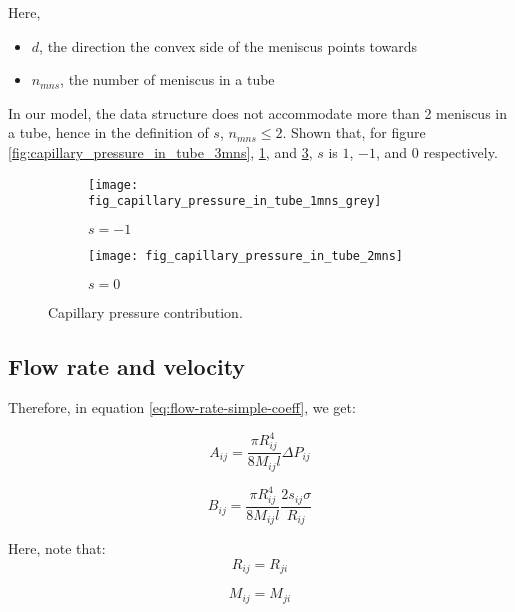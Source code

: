 	Here,
	\begin{itemize}
		\item $d$, the direction the convex side of the meniscus points towards
		\item $n_{mns}$, the number of meniscus in a tube
	\end{itemize}
	
	In our model, the data structure does not accommodate more than 2 meniscus in a tube, hence in the definition of $s$, $n_{mns} \le 2$. Shown that, for figure \ref{fig:capillary_pressure_in_tube_3mns}, \ref{fig:capillary_pressure_in_tube_1mns_grey}, and \ref{fig:capillary_pressure_in_tube_2mns}, $s$ is $1$, $-1$, and $0$ respectively.
	
	\begin{figure}[H]
		\centering
		\begin{subfigure}{0.45\textwidth}
			\centering
			\texttt{[image: fig\_capillary\_pressure\_in\_tube\_1mns\_grey]}
			\caption{$s = -1$}
			\label{fig:capillary_pressure_in_tube_1mns_grey}
		\end{subfigure}
		\hfill
		\begin{subfigure}{0.48\textwidth}
			\centering
			\texttt{[image: fig\_capillary\_pressure\_in\_tube\_2mns]}
			\caption{$s = 0$}
			\label{fig:capillary_pressure_in_tube_2mns}
		\end{subfigure}
		\caption{Capillary pressure contribution.}
	\end{figure}
		
	
\subsection{Flow rate and velocity} \label{sec:flow-rate-vel}
	Therefore, in equation \ref{eq:flow-rate-simple-coeff}, we get:
	
	\begin{equation} \label{eq:flow-rate-aij}
		A_{ij} = \frac{\pi R_{ij}^4}{8M_{ij}l} \Delta P_{ij}
	\end{equation}
	
	\begin{equation} \label{eq:flow-rate-bij}
		B_{ij} = \frac{\pi R_{ij}^4}{8M_{ij}l} \frac{2 s_{ij} \sigma}{R_{ij}}
	\end{equation}
	
	Here, note that:
	\begin{equation}
		R_{ij} = R_{ji}
	\end{equation}
	
	\begin{equation}
		M_{ij} = M_{ji}
	\end{equation}
	
